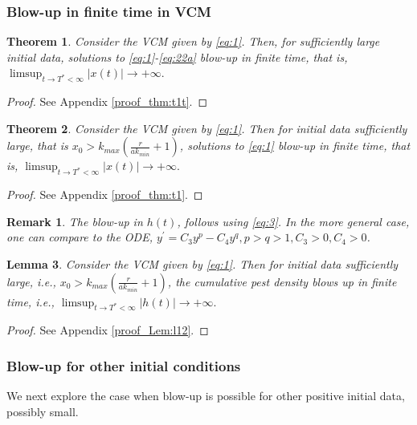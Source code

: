 \documentclass[sn-mathphys-num]{sn-jnl}
\newtheorem{theorem}{Theorem}[section]
\newtheorem{lemma}[theorem]{Lemma}
\newtheorem{remark}{Remark}
\numberwithin{equation}{section}
\numberwithin{equation}{section}
\begin{document}
\subsubsection{Blow-up in finite time in VCM }
\begin{theorem}
\label{thm:t1t}
Consider the VCM given by \eqref{eq:1}. Then, for sufficiently large initial data, solutions to
\eqref{eq:1}-\eqref{eq:22a} blow-up in finite time, that is, $
\limsup_{t \rightarrow T^{*} < \infty} |x(t)| \rightarrow + \infty.$
\end{theorem}
\begin{proof}
See Appendix \ref{proof_thm:t1t}.
\end{proof}
\begin{theorem}
\label{thm:t1}
Consider the VCM given by \eqref{eq:1}. Then for initial data sufficiently large, that is $x_{0} > k_{max}\left( \frac{r}{a k_{min}}  + 1 \right) $, solutions to 
\eqref{eq:1} blow-up in finite time, that is, $ \limsup_{t \rightarrow T^{*} < \infty} |x(t)| \rightarrow + \infty.$
\end{theorem}
\begin{proof}
    See Appendix \ref{proof_thm:t1}.
\end{proof}

\begin{remark}
The blow-up in $h(t)$, follows using \eqref{eq:3}. In the more general case, one can compare to the ODE, $\boxed{y^{'} = C_{3}y^{p} - C_{4}y^{q}}, p>q>1, C_{3}>0, C_{4} > 0$.
\end{remark}


\begin{lemma}
\label{Lem:l12}
Consider the VCM given by \eqref{eq:1}. Then for initial data sufficiently large, i.e., $x_{0} > k_{max}\left( \frac{r}{a k_{min}}  + 1 \right) $, the cumulative pest density blows up in finite time, i.e., $\limsup_{t \rightarrow T^{*} < \infty} |h(t)| \rightarrow + \infty.$
\end{lemma}


\begin{proof}
See Appendix \ref{proof_Lem:l12}.
\end{proof}




\subsubsection{Blow-up for other initial conditions}

We next explore the case when blow-up is possible for other positive initial data, possibly small. 
\end{document}
